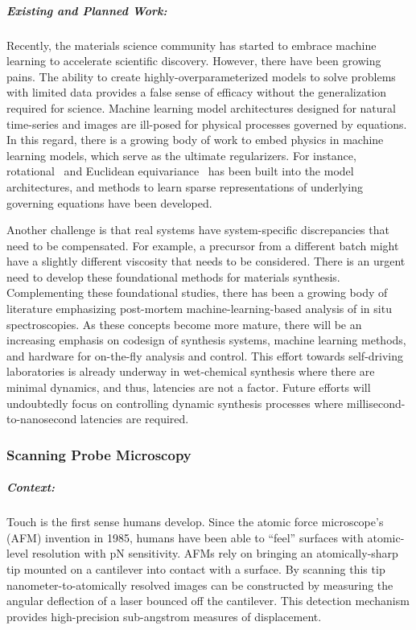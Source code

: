         
\subparagraph*{Existing and Planned Work:} Recently, the materials science community has started to embrace machine learning to accelerate scientific discovery\cite{Butler2018-qo,Schmidt2019-dz,Ramprasad2017-wp}. 
However, there have been growing pains. The ability to create highly-overparameterized models to solve problems with limited data provides a false sense of efficacy without the generalization required for science. 
Machine learning model architectures designed for natural time-series and images are ill-posed for physical processes governed by equations. 
In this regard, there is a growing body of work to embed physics in machine learning models, which serve as the ultimate regularizers. 
For instance, rotational~\cite{Oxley2020-hg,Kalinin2020-xl} and Euclidean equivariance~\cite{Smidt_undated-oh,Smidt2020-sh} has been built into the model architectures, and methods to learn sparse representations of underlying governing equations have been developed\cite{Kaheman2020-zt,De_Silva2020-ef,Champion2019-kh}.

Another challenge is that real systems have system-specific discrepancies that need to be compensated\cite{Kaheman2019-yu}. For example, a precursor from a different batch might have a slightly different viscosity that needs to be considered.  There is an urgent need to develop these foundational methods for materials synthesis. Complementing these foundational studies, there has been a growing body of literature emphasizing post-mortem machine-learning-based analysis of in situ spectroscopies\cite{Provence2020-ro,Trejo2019-ph}. 
As these concepts become more mature, there will be an increasing emphasis on codesign of synthesis systems, machine learning methods, and hardware for on-the-fly analysis and control. 
This effort towards self-driving laboratories is already underway in wet-chemical synthesis where there are minimal dynamics, and thus, latencies are not a factor\cite{MacLeod2020-mv,Langner2020-ds}. 
Future efforts will undoubtedly focus on controlling dynamic synthesis processes where millisecond-to-nanosecond latencies are required.

\subsubsection{Scanning Probe Microscopy}

\subparagraph*{Context:} Touch is the first sense humans develop. Since the atomic force microscope’s (AFM) invention in 1985\cite{Binnig1986-ig}, humans have been able to “feel” surfaces with atomic-level resolution with pN sensitivity. 
AFMs rely on bringing an atomically-sharp tip mounted on a cantilever into contact with a surface. By scanning this tip nanometer-to-atomically resolved images can be constructed by measuring the angular deflection of a laser bounced off the cantilever. This detection mechanism provides high-precision sub-angstrom measures of displacement. 

